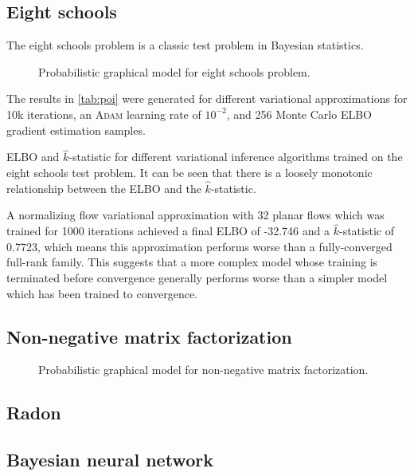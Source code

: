 \subsection{Eight schools}

The eight schools problem\cite{rubin1981estimation} is a classic test problem in Bayesian statistics\cite{gelman2013bayesian, carpenter2017stan}.

\begin{figure}
    \centering
    \caption{Probabilistic graphical model for eight schools problem.}
    \label{fig:8s-pgm}
\end{figure}

The results in \cref{tab:poi} were generated for different variational approximations for 10k iterations, an \textsc{Adam} \cite{kingma2014adam} learning rate of $10^{-2}$, and 256 Monte Carlo ELBO gradient estimation samples.

\begin{table}
\centering
\caption{ELBO and $\hat{k}$-statistic\cite{yao2018yes} for different variational inference algorithms trained on the eight schools test problem. It can be seen that there is a loosely monotonic relationship between the ELBO and the $\hat{k}$-statistic.}
\label{tab:poi}

\end{table}

A normalizing flow variational approximation with 32 planar flows which was trained for 1000 iterations achieved a final ELBO of -32.746 and a $\hat{k}$-statistic of 0.7723, which means this approximation performs worse than a fully-converged full-rank family.
This suggests that a more complex model whose training is terminated before convergence generally performs worse than a simpler model which has been trained to convergence.

\subsection{Non-negative matrix factorization}

\begin{figure}
    \centering
    \caption{Probabilistic graphical model for non-negative matrix factorization.}
    \label{fig:nnmf-pgm}
\end{figure}

\subsection{Radon}

\subsection{Bayesian neural network}



